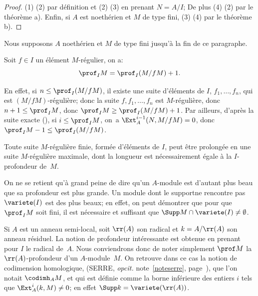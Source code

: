 \skpt
\begin{proof}
(1) \SSI (2) par d\'efinition et (2) \ALORS (3) en prenant $N=A/I$; De plus (4) \ALORS (2) par le th\'eor\`eme  a). Enfin, si $A$ est noeth\'erien et $M$ de type fini, (3) \ALORS (4) par le th\'eor\`eme  b).
\skipqed
\end{proof}

Nous supposons $A$ noeth\'erien et $M$ de type fini jusqu'\`a la fin de ce paragraphe.

\begin{corollaire} \label{III.2.5}
Soit $f\in I$ un \'el\'ement $M$-r\'egulier, on a:
\[
\prof_I M = \prof_I (M/fM) + 1.
\]
\end{corollaire}

En effet, si $n\leq \prof_I (M/fM)$, il existe une suite d'\'el\'ements de $I$, $f_1, \ldots, f_n$, qui est $(M/fM)$-r\'eguli\`ere; donc la suite $f, f_1, \ldots, f_n$ est $M$-r\'eguli\`ere, donc $n+1 \leq \prof_I M$, donc $\prof_I M\geq \prof_I (M/fM) + 1$. Par ailleurs, d'apr\`es la suite exacte (), si $i \leq \prof_I M$, on~a $\Ext_A^{i-1} (N, M/fM)=0$, donc $\prof_I M - 1 \leq \prof_I (M/fM)$.

\enlargethispage{1.2\baselineskip}%
\begin{corollaire} \label{III.2.6}
Toute suite $M$-r\'eguli\`ere finie, form\'ee d'\'el\'ements de $I$, peut \^etre prolong\'ee en une suite $M$-r\'eguli\`ere maximale, dont la longueur est n\'ecessairement \'egale \`a la $I$-profondeur de~$M$.
\end{corollaire}

\begin{remarque} \label{III.2.7}
On ne se retient qu'\`a grand peine de dire qu'un $A$-module est d'autant plus beau que sa profondeur est plus grande. Un module dont le support\pageoriginale ne rencontre pas $\variete (I)$ est des plus beaux; en effet, on peut d\'emontrer que pour que $\prof_I M$ soit fini, il est n\'ecessaire et suffisant que $\Supp M \cap \variete(I) \neq \emptyset$.
\end{remarque}

\begin{remarque} \label{III.2.8}
Si $A$ est un anneau semi-local, soit $\rr(A)$ son radical et $k=A/\rr(A)$ son anneau r\'esiduel. La notion de profondeur int\'eressante est obtenue en prenant pour $I$ le radical de~$A$. Nous conviendrons donc de noter simplement $\prof M$ la $\rr(A)$-profondeur d'un $A$-module~$M$. On retrouve dans ce cas la notion de \og codimension homologique\fg, (\cf SERRE, \textit{op\ptbl cit.} note~\eqref{noteserre}, page~\pageref{noteserre}), que l'on notait $\codimh_A M$, et qui est d\'efinie comme la borne inf\'erieure des entiers $i$ tels que $\Ext_A^i(k, M)\neq 0$; en effet $\Supp k = \variete(\rr(A))$.
\end{remarque}

